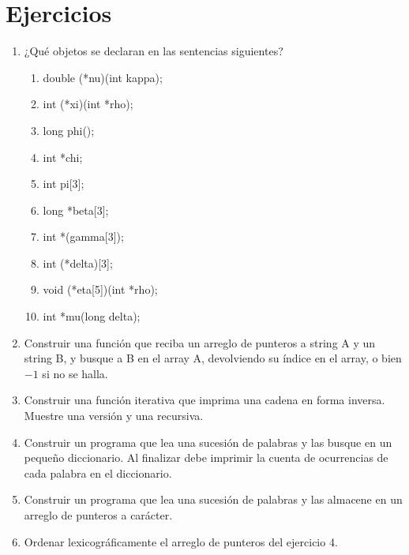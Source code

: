\section{Ejercicios}
\begin{enumerate}

\item ¿Qué objetos se declaran en las sentencias siguientes?
\begin{enumerate}[label=\alph*.]
	\item double (*nu)(int kappa);
	\item int (*xi)(int *rho);
	\item long phi();
	\item int *chi;
	\item int pi[3];
	\item long *beta[3];
	\item int *(gamma[3]);
	\item int (*delta)[3];
	\item void (*eta[5])(int *rho);
	\item int *mu(long delta);
\end{enumerate}

\item Construir una función que reciba un arreglo de punteros a string A y un
string B, y busque a B en el array A, devolviendo su índice en el array, o bien
$-1$ si no se halla.
\item Construir una función iterativa que imprima una cadena en forma inversa.
Muestre una versión y una recursiva.
\item Construir un programa que lea una sucesión de palabras y las busque en un
pequeño diccionario. Al finalizar debe imprimir la cuenta de ocurrencias de
cada palabra en el diccionario.
\item Construir un programa que lea una sucesión de palabras y las almacene en un
arreglo de punteros a carácter.
\item Ordenar lexicográficamente el arreglo de punteros del ejercicio 4.
\end{enumerate}


